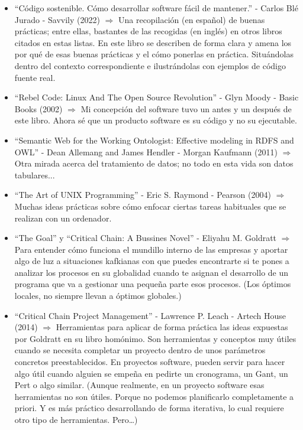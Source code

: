 \documentclass[spanish,12pt,a4paper,final,oneside]{book}
\begin{document}
\begin{itemize}

\item ``Código sostenible. Cómo desarrollar software fácil de mantener.'' - Carlos Blé Jurado - Savvily (2022) $\Rightarrow$ Una recopilación  (en español) de buenas prácticas; entre ellas, bastantes de las recogidas (en inglés) en otros libros citados en estas listas. En este libro se describen de forma clara y amena los por qué de esas buenas prácticas y el cómo ponerlas en práctica. Situándolas dentro del contexto correspondiente e ilustrándolas con ejemplos de código fuente real.

\item ``Rebel Code: Linux And The Open Source Revolution'' - Glyn Moody - Basic Books (2002) $\Rightarrow$ Mi concepción del software tuvo un antes y un después de este libro. Ahora sé que un producto software es su código y no su ejecutable.

\item ``Semantic Web for the Working Ontologist: Effective modeling in RDFS and OWL'' - Dean Allemang and James Hendler - Morgan Kaufmann (2011) $\Rightarrow$ Otra mirada acerca del tratamiento de datos; no todo en esta vida son datos tabulares...

\item ``The Art of UNIX Programming'' - Eric S. Raymond - Pearson (2004) $\Rightarrow$ Muchas ideas prácticas sobre cómo enfocar ciertas tareas habituales que se realizan con un ordenador.

\item ``The Goal'' y ``Critical Chain: A Bussines Novel'' - Eliyahu M. Goldratt $\Rightarrow$ Para entender cómo funciona el mundillo interno de las empresas y aportar algo de luz a situaciones kafkianas con que puedes encontrarte si te pones a analizar los procesos en su globalidad cuando te asignan el desarrollo de un programa que va a gestionar una pequeña parte esos procesos. (Los óptimos locales, no siempre llevan a óptimos globales.)

\item ``Critical Chain Project Management'' - Lawrence P. Leach - Artech House (2014) $\Rightarrow$ Herramientas para aplicar de forma práctica las ideas expuestas por Goldratt en su libro homónimo. Son herramientas y conceptos muy útiles cuando se necesita completar un proyecto dentro de unos parámetros concretos preestablecidos. En proyectos software, pueden servir para hacer algo útil cuando alguien se empeña en pedirte un cronograma, un Gant, un Pert o algo similar. (Aunque realmente, en un proyecto software esas herramientas no son útiles. Porque no podemos planificarlo completamente a priori.  Y es más práctico desarrollando de forma iterativa, lo cual requiere otro tipo de herramientas. Pero\ldots)


\end{itemize}
\end{document}
